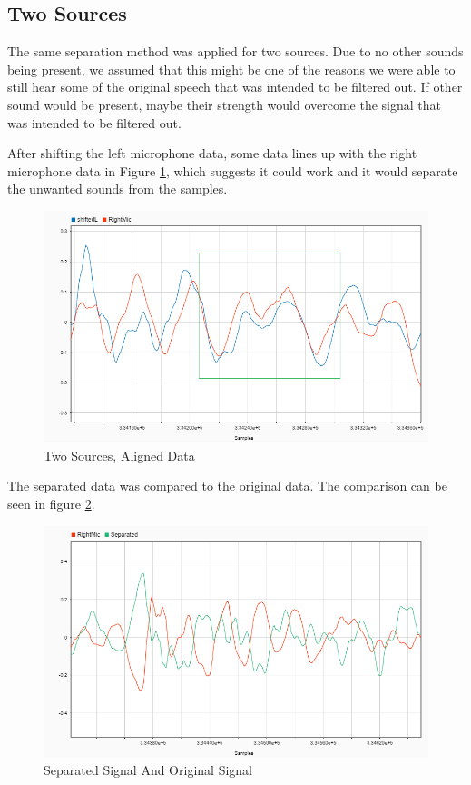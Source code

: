 \newpage

\subsection{Two Sources}
The same separation method was applied for two sources. Due to no other sounds being present,
we assumed that this might be one of the reasons we were able to still hear some of the original speech
that was intended to be filtered out. If other sound would be present, maybe their strength would overcome
the signal that was intended to be filtered out.

After shifting the left microphone data, some data lines up with the right microphone data in Figure 
\ref{fig:2sourcesShifted}, which suggests it could work and it would separate the unwanted sounds from the 
samples. 

\begin{figure}[htp]
  \centering
  \includegraphics[width=1\linewidth]{Illustrations/twoSourcesShiftedandOriginal.png}
  \caption{Two Sources, Aligned Data}
  \label{fig:2sourcesShifted}
\end{figure}
\newpage
The separated data was compared to the original data. The comparison can be seen in figure \ref{fig:2sourcesSeparated}.
\begin{figure}[htp]
  \centering
  \includegraphics[width=0.7\linewidth]{Illustrations/twoSourcesSeparatedandOriginal.png}
  \caption{Separated Signal And Original Signal}
  \label{fig:2sourcesSeparated}
\end{figure}
